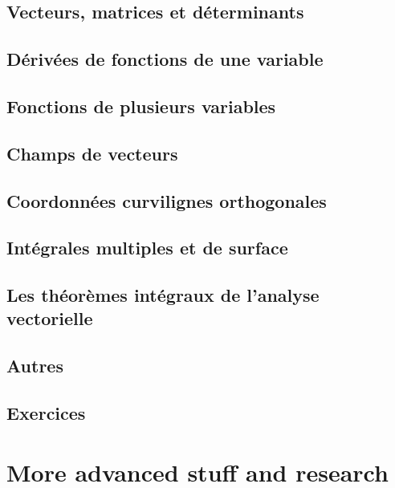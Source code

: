 %
\chapter{Vecteurs, matrices et déterminants}
    

\chapter{Dérivées de fonctions de une variable}


\chapter{Fonctions de plusieurs variables}


\chapter{Champs de vecteurs}


\chapter{Coordonnées curvilignes orthogonales}


\chapter{Intégrales multiples et de surface}


\chapter{Les théorèmes intégraux de l'analyse vectorielle}


\chapter{Autres}


\chapter{Exercices}



%


\part{More advanced stuff and research}

